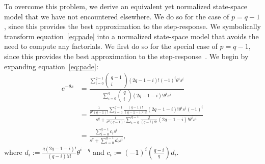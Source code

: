 To overcome this problem, we derive an equivalent yet normalized state-space model that we have not encountered elsewhere.
We do so for the case of $p = q - 1$, since this provides the best approximation to the step-response. We symbolically transform equation~\ref{eq:pade} into a normalized state-space model that avoids the need to compute any factorials.
We first do so for the special case of $p = q - 1$, since this provides the best approximation to the step-response~\citep{vajta2000some}.
We begin by expanding equation~\ref{eq:pade}:
\begin{align*}
[q-1/q]e^{-\theta s} &= \frac{\sum_{i=0}^{q-1} \begin{pmatrix}{q-1} \\ i\end{pmatrix} (2q - 1 - i)! (-1)^i \theta^i s^i}{\sum_{i=0}^q \begin{pmatrix}q \\ i\end{pmatrix} (2q - 1 - i)! \theta^i s^i} \\
&= \frac{\frac{1}{\theta^{q} (q-1)!} \sum_{i=0}^{q-1} \frac{(q-1)!}{(q-1-i)!i!} (2q - 1- i)! \theta^i s^i (-1)^i}{s^q + \frac{1}{\theta^q (q-1)!}  \sum_{i=0}^{q-1} \frac{q!}{(q-i)!i!} (2q - 1 - i)! \theta^i s^i} \\
&= \frac{\sum_{i=0}^{q-1} c_i s^i}{s^q + \sum_{i=0}^{q-1} d_i s^i} \text{,}
\end{align*}
where $d_i := \frac{q(2q - 1 - i)!}{(q-i)!i!} \theta^{i-q}$ and $c_i := (-1)^i \left( \frac{q-i}{q} \right) d_i$.

